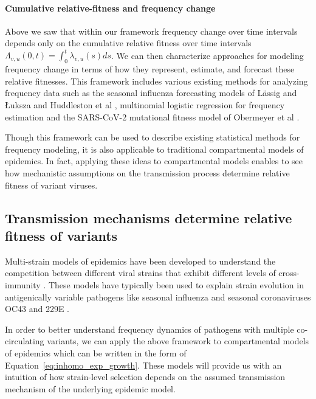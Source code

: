 \documentclass[12pt,oneside,letterpaper]{article}
\begin{document}
\paragraph{Cumulative relative-fitness and frequency change}

Above we saw that within our framework frequency change over time intervals depends only on the cumulative relative fitness over time intervals $\Lambda_{v,u}(0, t) = \int_{0}^{t} \lambda_{v, u}(s)ds$.
We can then characterize approaches for modeling frequency change in terms of how they represent, estimate, and forecast these relative fitnesses.
This framework includes various existing methods for analyzing frequency data such as the seasonal influenza forecasting models of L{\"a}ssig and {\L}uksza \cite{luksza2014predictive} and Huddleston et al \cite{Huddleston2020}, multinomial logistic regression for frequency estimation \cite{Annavajhala2021} and the SARS-CoV-2 mutational fitness model of Obermeyer et al \cite{Obermeyer2022}.

Though this framework can be used to describe existing statistical methods for frequency modeling, it is also applicable to traditional compartmental models of epidemics.
In fact, applying these ideas to compartmental models enables to see how mechanistic assumptions on the transmission process determine relative fitness of variant viruses.

\subsection*{Transmission mechanisms determine relative fitness of variants}

Multi-strain models of epidemics have been developed to understand the competition between different viral strains that exhibit different levels of cross-immunity \cite{Gog2002, Wen2022}.
These models have typically been used to explain strain evolution in antigenically variable pathogens like seasonal influenza \cite{Bedford2014} and seasonal coronaviruses OC43 and 229E \cite{Kistler2021, Eguia2021}.

In order to better understand frequency dynamics of pathogens with multiple co-circulating variants, we can apply the above framework to compartmental models of epidemics which can be written in the form of Equation~\ref{eq:inhomo_exp_growth}.
These models will provide us with an intuition of how strain-level selection depends on the assumed transmission mechanism of the underlying epidemic model.
\end{document}
